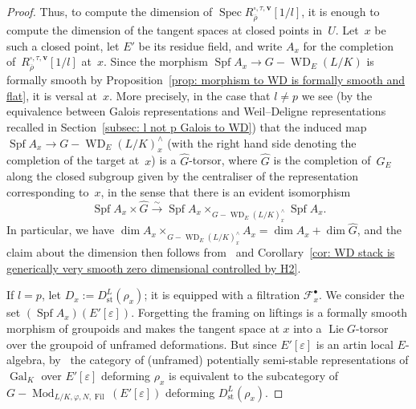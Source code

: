 \documentclass{amsart}
\DeclareMathOperator{\Lie}{Lie}
\newcommand{\To}{\longrightarrow}
\newcommand{\isoto}{\stackrel{\sim}{\To}}
\theoremstyle{definition}
\theoremstyle{remark}
\newcommand{\mar}[1]{}
\newcommand{\mar}[1]{\marginpar{\raggedright\tiny squirrel #1}}
\DeclareMathOperator{\Fil}{Fil}
\DeclareMathOperator{\Gal}{Gal}
\DeclareMathOperator{\Mod}{Mod}
\DeclareMathOperator{\Spec}{Spec}
\DeclareMathOperator{\Spf}{Spf}
\DeclareMathOperator{\WD}{WD}
\newcommand{\st}{\mathrm{st}}
\newcommand{\rhobar}{\overline{\rho}}
\begin{document}
\begin{proof}
Thus, to compute the dimension of
$\Spec R_{\rhobar}^{\square,\tau,\mathbf{v}}[1/l]$, it is 
enough to compute the dimension of the tangent spaces at closed points
in~$U$. Let~$x$ be such a closed point, let $E'$ be its residue field, and write $A_x$ for the
completion of~$R_{\rhobar}^{\square,\tau,\mathbf{v}}[1/l]$
at~$x$. Since the morphism $\Spf A_x\to G-\WD_E(L/K)$ is formally
smooth by
Proposition~\ref{prop: morphism to WD is formally smooth and flat}, it
is  versal at~$x$. More precisely, in the case that 
$l\ne p$ we see (by the equivalence between Galois representations and
Weil--Deligne representations recalled in Section~\ref{subsec: l not p Galois to
  WD}) that  the induced map $\Spf A_x\to G-\WD_E(L/K)^{\wedge}_x$
(with the right hand side denoting the completion of the target
at~$x$) is a $\widehat{G}$-torsor, 
where $\widehat{G}$ is the completion of~$G_{E}$ along the closed
subgroup given by the centraliser of the representation corresponding to~$x$, in the sense that there is an evident isomorphism \[\Spf
  A_x\times\widehat{G}\isoto\Spf
  A_x\times_{G-\WD_E(L/K)^{\wedge}_x}\Spf A_x. \]In particular, we have
$\dim A_x\times_{G-\WD_E(L/K)_x^\wedge} A_x=\dim A_x+\dim\widehat{G}$, and the
claim about the dimension then follows from~\cite[Lem.\
2.40]{EGcomponents} and Corollary~\ref{cor: WD stack is generically very smooth zero dimensional
  controlled by H2}.%

If $l=p$, let $D_x:=D_{\st}^L(\rho_x)$; it is equipped with a filtration $\mathcal{F}_x^\bullet$.  We consider the set $(\Spf A_x)(E'[\varepsilon])$.  Forgetting the framing on liftings is a formally smooth morphism of groupoids and makes the tangent space at $x$ into a $\Lie G$-torsor over the groupoid of unframed deformations.  But since $E'[\varepsilon]$ is an artin local $E$-algebra, by~\cite[Proposition 2.4]{2014arXiv1403.1411B} the category of (unframed) potentially semi-stable representations of $\Gal_K$ over $E'[\varepsilon]$ deforming $\rho_x$ is equivalent to the subcategory of $G-\Mod_{L/K,\varphi,N,\Fil}(E'[\varepsilon])$ deforming $D_{\st}^L(\rho_x)$.  


\end{proof}
\end{document}
